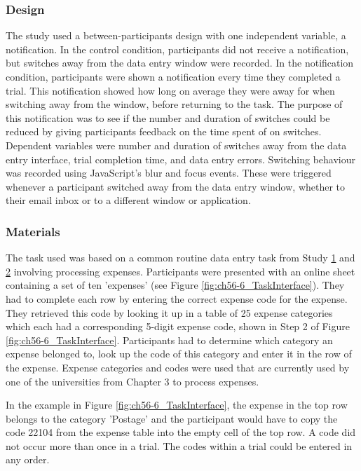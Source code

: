 \subsubsection{Design}
The study used a between-participants design with one independent variable, a notification. In the control condition, participants did not receive a notification, but switches away from the data entry window were recorded. In the notification condition, participants were shown a notification every time they completed a trial. This notification showed how long on average they were away for when switching away from the window, before returning to the task. The purpose of this notification was to see if the number and duration of switches could be reduced by giving participants feedback on the time spent of on switches. Dependent variables were number and duration of switches away from the data entry interface, trial completion time, and data entry errors. Switching behaviour was recorded using JavaScript's blur and focus events. These were triggered whenever a participant switched away from the data entry window, whether to their email inbox or to a different window or application. 

\subsubsection{Materials}
The task used was based on a common routine data entry task from Study \hyperref[st:Study1]{1} and \hyperref[st:Study2]{2} involving processing expenses. Participants were presented with an online sheet containing a set of ten 'expenses' (see Figure \ref{fig:ch56-6_TaskInterface}). They had to complete each row by entering the correct expense code for the expense. They retrieved this code by looking it up in a table of 25 expense categories which each had a corresponding 5-digit expense code, shown in Step 2 of Figure \ref{fig:ch56-6_TaskInterface}. Participants had to determine which category an expense belonged to, look up the code of this category and enter it in the row of the expense.  Expense categories and codes were used that are currently used by one of the  universities from Chapter 3 to process expenses.

In the example in Figure \ref{fig:ch56-6_TaskInterface}, the expense in the top row belongs to the category 'Postage' and the participant would have to copy the code 22104 from the expense table into the empty cell of the top row. A code did not occur more than once in a trial. The codes within a trial could be entered in any order. 

